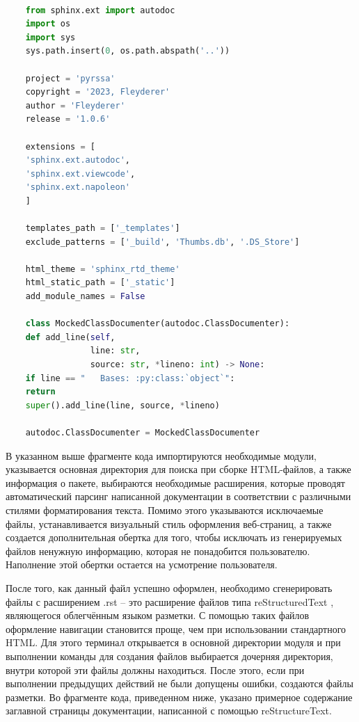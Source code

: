 \documentclass[specialist,
			   substylefile = spbu_report.rtx,
			   subf,href,colorlinks=true, 12pt]{disser}
\begin{document}
\begin{lstlisting}[language=Python, caption=Содержимое конфигурационного файла.]
	
	from sphinx.ext import autodoc
	import os
	import sys
	sys.path.insert(0, os.path.abspath('..'))

	project = 'pyrssa'
	copyright = '2023, Fleyderer'
	author = 'Fleyderer'
	release = '1.0.6'
	
	extensions = [
	'sphinx.ext.autodoc',
	'sphinx.ext.viewcode',
	'sphinx.ext.napoleon'
	]
	
	templates_path = ['_templates']
	exclude_patterns = ['_build', 'Thumbs.db', '.DS_Store']
	
	html_theme = 'sphinx_rtd_theme'
	html_static_path = ['_static']
	add_module_names = False
	
	class MockedClassDocumenter(autodoc.ClassDocumenter):
	def add_line(self,
	             line: str, 
	             source: str, *lineno: int) -> None:
	if line == "   Bases: :py:class:`object`":
	return
	super().add_line(line, source, *lineno)
	
	autodoc.ClassDocumenter = MockedClassDocumenter
\end{lstlisting}

В указанном выше фрагменте кода импортируются необходимые модули, указывается основная директория для поиска при сборке HTML-файлов, а также информация о пакете, выбираются необходимые расширения, которые проводят автоматический парсинг написанной документации в соответствии с различными стилями форматирования текста. Помимо этого указываются исключаемые файлы, устанавливается визуальный стиль оформления веб-страниц, а также создается дополнительная обертка для того, чтобы исключать из генерируемых файлов ненужную информацию, которая не понадобится пользователю. Наполнение этой обертки остается на усмотрение пользователя.

После того, как данный файл успешно оформлен, необходимо сгенерировать файлы с расширением .rst – это расширение файлов типа reStructuredText \cite{rst-doc}, являющегося облегчённым языком разметки. С помощью таких файлов оформление навигации становится проще, чем при использовании стандартного HTML. Для этого терминал открывается в основной директории модуля и при выполнении команды для создания файлов выбирается дочерняя директория, внутри которой эти файлы должны находиться. После этого, если при выполнении предыдущих действий не были допущены ошибки, создаются файлы разметки. Во фрагменте кода, приведенном ниже, указано примерное содержание заглавной страницы документации, написанной с помощью reStructureText.
\end{document}
